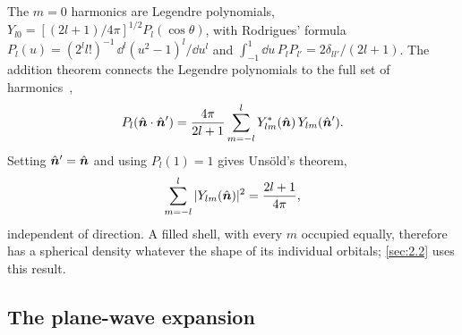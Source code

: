 The $m = 0$ harmonics are Legendre polynomials, $Y_{l0} = [(2l + 1)/4\pi]^{1/2}P_l(\cos\theta)$, with Rodrigues' formula $P_l(u) = (2^ll!)^{-1}\,\dd^l(u^2 - 1)^l/\dd u^l$ and $\int_{-1}^{1}\dd u\,P_lP_{l'} = 2\delta_{ll'}/(2l + 1)$. The addition theorem connects the Legendre polynomials to the full set of harmonics~\cite[Eq.~(14.30.9)]{olver2010nist},
\begin{equation}
  P_l(\hat{\bm{n}}\cdot\hat{\bm{n}}') = \frac{4\pi}{2l + 1}\sum_{m=-l}^{l}Y_{lm}^*(\hat{\bm{n}})\,Y_{lm}(\hat{\bm{n}}') .
  \label{eq:C.3-addition}
\end{equation}
Setting $\hat{\bm{n}}' = \hat{\bm{n}}$ and using $P_l(1) = 1$ gives Uns\"old's theorem,
\begin{equation}
  \sum_{m=-l}^{l}|Y_{lm}(\hat{\bm{n}})|^2 = \frac{2l + 1}{4\pi} ,
  \label{eq:C.3-unsold}
\end{equation}
independent of direction. A filled shell, with every $m$ occupied equally, therefore has a spherical density whatever the shape of its individual orbitals; \cref{sec:2.2} uses this result.

\subsection{The plane-wave expansion}

